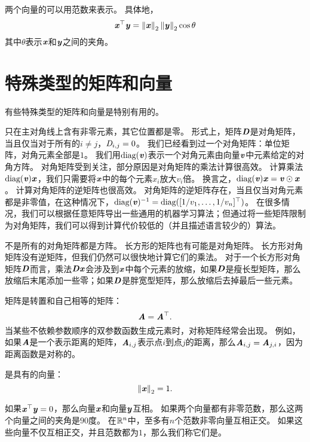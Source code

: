 两个向量的可以用范数来表示。
具体地，
\begin{equation}
    \Vx^\top\Vy = \norm{\Vx}_2\norm{\Vy}_2 \cos \theta
\end{equation}
其中$\theta$表示$\Vx$和$\Vy$之间的夹角。




\section{特殊类型的矩阵和向量}
\label{sec:special_kinds_of_matrices_and_vectors}

有些特殊类型的矩阵和向量是特别有用的。


只在主对角线上含有非零元素，其它位置都是零。
形式上，矩阵$\MD$是对角矩阵，当且仅当对于所有的$i\neq j$，$\SD_{i,j}=0$。
我们已经看到过一个对角矩阵：单位矩阵，对角元素全部是$1$。
我们用$\text{diag}(\Vv)$表示一个对角元素由向量$\Vv$中元素给定的对角方阵。
对角矩阵受到关注，部分原因是对角矩阵的乘法计算很高效。
计算乘法$\text{diag}(\Vv)\Vx$，我们只需要将$\Vx$中的每个元素$x_i$放大$v_i$倍。
换言之，$\text{diag}(\Vv)\Vx=\Vv \odot \Vx$。
计算对角矩阵的逆矩阵也很高效。
对角矩阵的逆矩阵存在，当且仅当对角元素都是非零值，在这种情况下，$\text{diag}(\Vv)^{-1}=\text{diag}([1/v_1,\dots,1/v_n]^\top)$。
在很多情况，我们可以根据任意矩阵导出一些通用的机器学习算法；但通过将一些矩阵限制为对角矩阵，我们可以得到计算代价较低的（并且描述语言较少的）算法。


不是所有的对角矩阵都是方阵。
长方形的矩阵也有可能是对角矩阵。
长方形对角矩阵没有逆矩阵，但我们仍然可以很快地计算它们的乘法。
对于一个长方形对角矩阵$\MD$而言，乘法$\MD\Vx$会涉及到$\Vx$中每个元素的放缩，如果$\MD$是瘦长型矩阵，那么放缩后末尾添加一些零；如果$\MD$是胖宽型矩阵，那么放缩后去掉最后一些元素。



矩阵是转置和自己相等的矩阵：
\begin{equation}
    \MA=\MA^\top.
\end{equation}
当某些不依赖参数顺序的双参数函数生成元素时，对称矩阵经常会出现。
例如，如果$\MA$是一个表示距离的矩阵，$\MA_{i,j}$表示点$i$到点$j$的距离，那么$\MA_{i,j}=\MA_{j,i}$，因为距离函数是对称的。


是具有的向量：
\begin{equation}
\norm{\Vx}_2=1.
\end{equation}


如果$\Vx^\top \Vy = 0$，那么向量$\Vx$和向量$\Vy$互相。
如果两个向量都有非零范数，那么这两个向量之间的夹角是$90$度。
在$\SetR^n$中，至多有$n$个范数非零向量互相正交。
如果这些向量不仅互相正交，并且范数都为$1$，那么我们称它们是。


